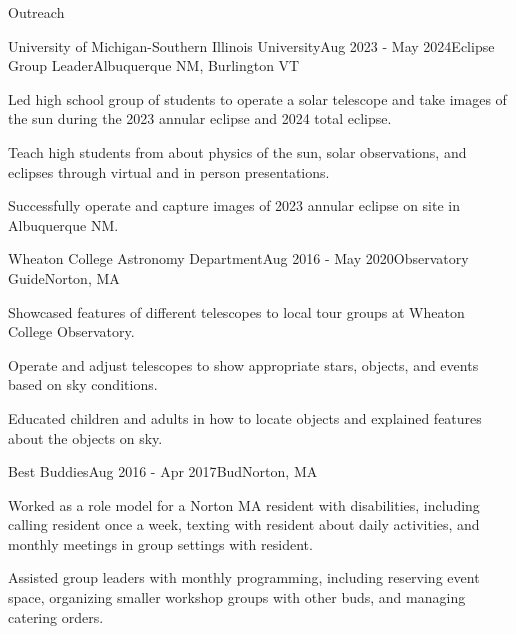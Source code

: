 \documentclass{resume} %
\begin{document}
\begin{rSection}{Outreach}

\begin{rSubsection}{University of Michigan-Southern Illinois University}{Aug 2023 - May 2024}{Eclipse Group Leader}{Albuquerque NM, Burlington VT}
    \item Led high school group of students to operate a solar telescope and take images of the sun during the 2023 annular eclipse and 2024 total eclipse.
    \item Teach high students from about physics of the sun, solar observations, and eclipses through virtual and in person presentations.
    \item Successfully operate and capture images of 2023 annular eclipse on site in Albuquerque NM.
\end{rSubsection}
\newpage
\begin{rSubsection}{Wheaton College Astronomy Department}{Aug 2016 - May 2020}{Observatory Guide}{Norton, MA}
\item Showcased features of different telescopes to local tour groups at Wheaton College Observatory.
\item Operate and adjust telescopes to show appropriate stars, objects, and events based on sky conditions.
\item Educated children and adults in how to locate objects and explained features about the objects on sky.

\end{rSubsection}

\begin{rSubsection}{Best Buddies}{Aug 2016 - Apr 2017}{Bud}{Norton, MA}
    \item Worked as a role model for a Norton MA resident with disabilities, including calling resident once a week, texting with resident about daily activities, and monthly meetings in group settings with resident.
    \item Assisted group leaders with monthly programming, including reserving event space, organizing smaller workshop groups with other buds, and managing catering orders.
\end{rSubsection}

\end{rSection}
\end{document}
